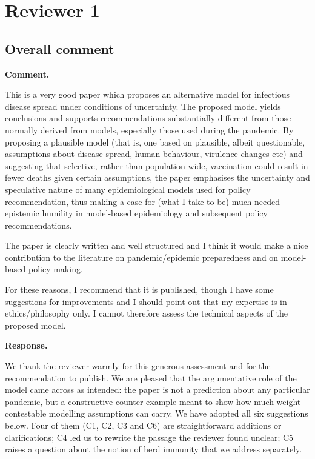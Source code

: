\documentclass[a4paper,12pt]{article}
\newcommand{\reply}[1]{#1}
\newcommand{\rlabel}[1]{\par\medskip\noindent\textbf{#1}\par\nobreak}
\begin{document}
\bigskip

\section*{Reviewer 1}

\subsection*{Overall comment}

\rlabel{Comment.}
This is a very good paper which proposes an alternative model for infectious disease spread under conditions of uncertainty. The proposed model yields conclusions and supports recommendations substantially different from those normally derived from models, especially those used during the pandemic. By proposing a plausible model (that is, one based on plausible, albeit questionable, assumptions about disease spread, human behaviour, virulence changes etc) and suggesting that selective, rather than population-wide, vaccination could result in fewer deaths given certain assumptions, the paper emphasises the uncertainty and speculative nature of many epidemiological models used for policy recommendation, thus making a case for (what I take to be) much needed epistemic humility in model-based epidemiology and subsequent policy recommendations.

The paper is clearly written and well structured and I think it would make a nice contribution to the literature on pandemic/epidemic preparedness and on model-based policy making.

For these reasons, I recommend that it is published, though I have some suggestions for improvements and I should point out that my expertise is in ethics/philosophy only. I cannot therefore assess the technical aspects of the proposed model.

\rlabel{Response.}
\reply{We thank the reviewer warmly for this generous assessment and for the
recommendation to publish. We are pleased that the argumentative role of the
model came across as intended: the paper is not a prediction about any
particular pandemic, but a constructive counter-example meant to show how much
weight contestable modelling assumptions can carry. We have adopted all six
suggestions below. Four of them (C1, C2, C3 and C6) are straightforward
additions or clarifications; C4 led us to rewrite the passage the reviewer
found unclear; C5 raises a question about the notion of herd immunity that we
address separately.}
\end{document}
